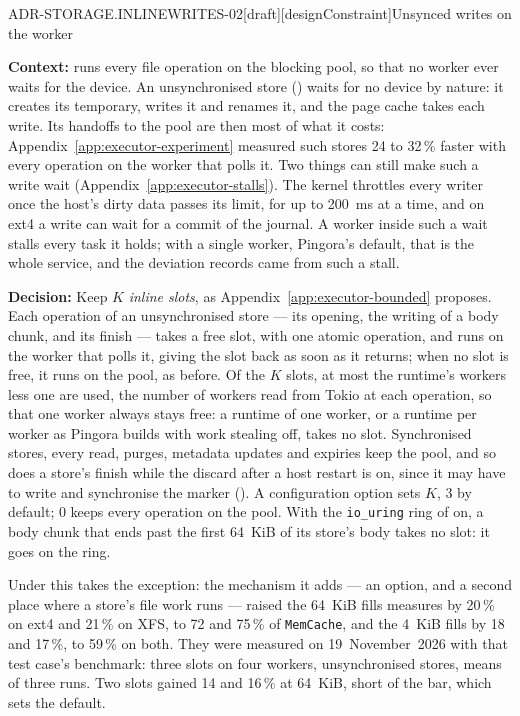 \begin{requirement}{ADR-STORAGE.INLINEWRITES-02}[draft][designConstraint]{Unsynced writes on the worker}


  \textbf{Context:}  runs every file
  operation on the blocking pool, so that no worker ever waits for the
  device. An unsynchronised store ()
  waits for no device by nature: it creates its temporary, writes it and
  renames it, and the page cache takes each write. Its handoffs to the pool
  are then most of what it costs: Appendix~\ref{app:executor-experiment}
  measured such stores 24 to 32\,\% faster with every operation on the
  worker that polls it. Two things can still make such a write wait
  (Appendix~\ref{app:executor-stalls}). The kernel throttles every writer
  once the host's dirty data passes its limit, for up to 200~ms at a time,
  and on ext4 a write can wait for a commit of the journal. A worker inside
  such a wait stalls every task it holds; with a single worker, Pingora's
  default, that is the whole service, and the deviation
   records came from such a stall.

  \textbf{Decision:} Keep $K$ \emph{inline slots}, as
  Appendix~\ref{app:executor-bounded} proposes. Each operation of an
  unsynchronised store --- its opening, the writing of a body chunk, and its
  finish --- takes a free slot, with one atomic operation, and runs on the
  worker that polls it, giving the slot back as soon as it returns; when no
  slot is free, it runs on the pool, as before. Of the $K$ slots, at most
  the runtime's workers less one are used, the number of workers read from
  Tokio at each operation, so that one worker always stays free: a runtime
  of one worker, or a runtime per worker as Pingora builds with work
  stealing off, takes no slot. Synchronised stores, every read, purges,
  metadata updates and expiries keep the pool, and so does a store's finish
  while the discard after a host restart is on, since it may have to write
  and synchronise the marker (). A
  configuration option sets $K$, 3 by default; 0 keeps every operation on
  the pool. With the \texttt{io\_uring} ring of
   on, a body chunk that ends past the
  first 64~KiB of its store's body takes no slot: it goes on the ring.

  Under  this takes the exception: the mechanism it
  adds --- an option, and a second place where a store's file work runs ---
  raised the 64~KiB fills  measures by
  20\,\% on ext4 and 21\,\% on XFS, to 72 and 75\,\% of \texttt{MemCache},
  and the 4~KiB fills by 18 and 17\,\%, to 59\,\% on both. They were
  measured on 19~November~2026 with that test case's benchmark: three slots
  on four workers, unsynchronised stores, means of three runs. Two slots
  gained 14 and 16\,\% at 64~KiB, short of the bar, which sets the default.


\end{requirement}
